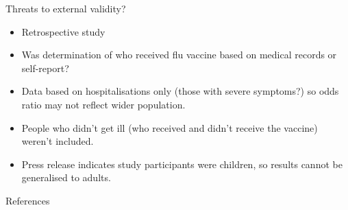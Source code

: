 \documentclass{beamer}
\begin{document}
\begin{frame}{Threats to external validity?}
	\begin{itemize}
	\item Retrospective study
	\item Was determination of who received flu vaccine based on medical records or self-report?
	\item Data based on hospitalisations only (those with severe symptoms?) so odds ratio may not reflect wider population.
	\item People who didn't get ill (who received and didn't receive the vaccine) weren't included.
	\item Press release indicates study participants were children, so results cannot be generalised to adults.
	\end{itemize}
\end{frame}

\begin{frame}{References} %
	
	\small
\end{frame}
\end{document}
